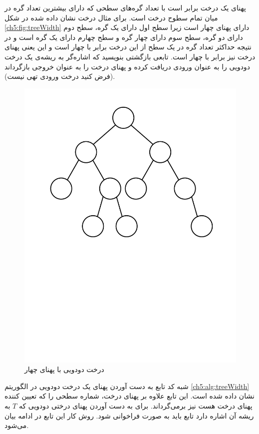  پهنای یک درخت برابر است با تعداد گره‌های سطحی که دارای بیشترین تعداد گره در میان تمام سطوح درخت است.  برای مثال درخت نشان داده شده در شکل {\eqref{ch5:fig:treeWidth}} دارای پهنای چهار است زیرا سطح اول دارای یک گره، سطح دوم دارای دو گره، سطح سوم دارای چهار گره و سطح چهارم دارای یک گره است و در نتیجه حداکثر تعداد گره در یک سطح از این درخت برابر با چهار است و این یعنی پهنای درخت نیز برابر با چهار است. تابعی بازگشتی بنویسید که اشاره‌گر به ریشه‌ی یک درخت دودویی را به عنوان ورودی دریافت کرده و پهنای درخت را به عنوان خروجی بازگرداند (فرض کنید درخت ورودی تهی نیست).

\begin{figure}
\begin{center}
\includegraphics[scale=0.33]{figs/ch5/tree_width.pdf}
\caption{درخت دودویی با پهنای چهار}\label{ch5:fig:treeWidth}
\end{center}
\end{figure}


شبه کد تابع به دست آوردن پهنای یک درخت دودویی در الگوریتم {\eqref{ch5:alg:treeWidth}} نشان داده شده است. این تابع علاوه بر پهنای درخت، شماره سطحی را که تعیین کننده پهنای درخت هست نیز برمی‌گرداند. برای به دست آوردن پهنای درختی دودویی که {$T$} به ریشه آن اشاره دارد تابع {} باید به صورت {} فراخوانی شود. روش کار این تابع در ادامه بیان می‌شود.

